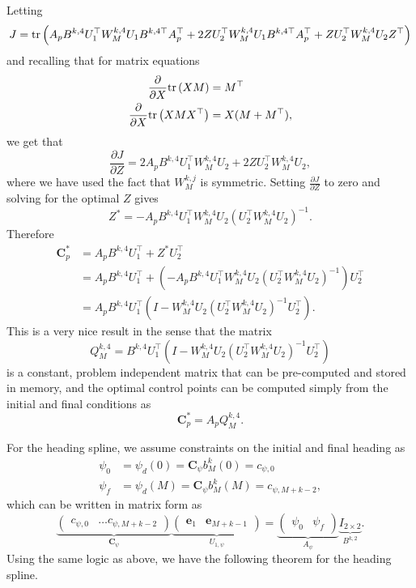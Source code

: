	Letting
	\[
		J = \text{tr}\left(A_p B^{k,4} U_1^\top W_M^{k,4} U_1 B^{k,4\top}A_p^\top + 2Z U_2^\top W_M^{k,4} U_1 B^{k,4\top}A_p^\top + Z U_2^\top W_M^{k,4} U_2 Z^\top\right)
	\]
	and recalling that for matrix equations
	\begin{align*}
		\frac{\partial}{\partial X}\text{tr}\left(XM\right) &= M^\top \\	
		\frac{\partial}{\partial X}\text{tr}\left(XMX^\top\right) &= X(M+M^\top),
	\end{align*}
	we get that
	\[
	\frac{\partial J}{\partial Z} = 2 A_pB^{k,4} U_1^\top W_M^{k,4} U_2 + 2 Z U_2^\top W_M^{k,4} U_2, 
	\]
	where we have used the fact that $W_M^{k,j}$ is symmetric.  Setting $\frac{\partial J}{\partial Z}$ to zero and solving for the optimal $Z$ gives
	\[
	Z^\ast = -A_p B^{k,4} U_1^\top W_M^{k,4} U_2 (U_2^\top W_M^{k,4} U_2)^{-1}.
	\]
	Therefore
	\begin{align*}
		\mathbf{C}_p^\ast 
			&= A_p B^{k,4} U_1^\top + Z^\ast U_2^\top \\	
			&= A_p B^{k,4} U_1^\top + \left(-A_p B^{k,4} U_1^\top W_M^{k,4} U_2 (U_2^\top W_M^{k,4} U_2)^{-1}\right) U_2^\top \\	
			&= A_p B^{k,4} U_1^\top \left( I - W_M^{k,4} U_2 (U_2^\top W_M^{k,4} U_2)^{-1} U_2^\top \right).	
	\end{align*}
\endproof
This is a very nice result in the sense that the matrix
\[
Q_M^{k,4} = B^{k,4} U_1^\top \left(I-W_M^{k,4}U_2(U_2^\top W_M^{k,4} U_2)^{-1}U_2^\top\right)
\]
is a constant, problem independent matrix that can be pre-computed and stored in memory, and the optimal control points can be computed simply from the initial and final conditions as 
\[
\mathbf{C}_p^\ast = A_p Q_M^{k,4}.
\]

For the heading spline, we assume constraints on the initial and final heading as
\begin{align*}
	\psi_0 &= \psi_d(0) = \mathbf{C}_\psi b_M^k(0) = c_{\psi,0}	\\
	\psi_f &= \psi_d(M) = \mathbf{C}_\psi b_M^k(M) = c_{\psi,M+k-2},
\end{align*}
which can be written in matrix form as
\[
	\underbrace{\begin{pmatrix}c_{\psi,0} & \dots c_{\psi,M+k-2} \end{pmatrix}}_{\mathbf{C}_\psi}
	\underbrace{\begin{pmatrix} \mathbf{e}_1 & \mathbf{e}_{M+k-1} \end{pmatrix}}_{U_{1,\psi}}
	 = 
	\underbrace{\begin{pmatrix}\psi_0 & \psi_f \end{pmatrix}}_{A_\psi}
	\underbrace{I_{2\times 2}}_{B^{k,2}}.
\]
Using the same logic as above, we have the following theorem for the heading spline.

